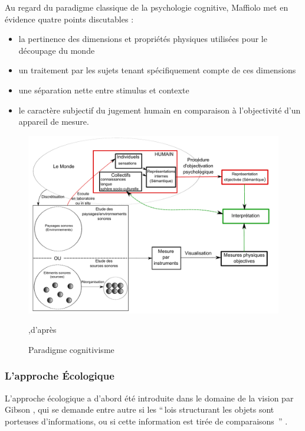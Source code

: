 Au regard du paradigme classique de la psychologie cognitive, Maffiolo met en évidence quatre points discutables :

\begin{itemize}
\item la pertinence des dimensions et propriétés physiques utilisées pour le découpage du monde
\item un traitement par les sujets tenant spécifiquement compte de ces dimensions
\item une séparation nette entre stimulus et contexte
\item le caractère subjectif du jugement humain en comparaison à l'objectivité d'un appareil de mesure.
\end{itemize}

\begin{figure}[bth]
        \myfloatalign
        \includegraphics[width=\linewidth]{gfx/Shema_maffiolo}
        \caption[Paradigme du cognitivisme]{Paradigme cognitivisme},d'après \citep{maffiolo_caracterisation_1999}\label{fig:paradigme Cognitivisme}
\end{figure}

\subsubsection{L'approche Écologique}
\label{sec:ecologique}

L'approche écologique a d'abord été introduite dans le domaine de la vision par Gibson \citep{gibson1966senses}, qui se demande entre autre si les ``\,lois structurant les objets sont porteuses d'informations, ou si cette information est tirée de comparaisons \,'' \citep{gibson1978ecological}.

